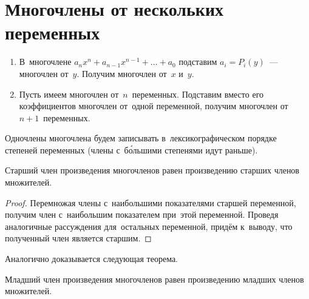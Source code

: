 \section{Многочлены от нескольких переменных}
\begin{enumerate}
	\item В~многочлене $a_n x^n + a_{n-1} x^{n-1} + \ldots + a_0$ подставим $a_i = P_i(y)$~--- многочлен от~$y$.
	Получим многочлен от~$x$ и~$y$.
	
	\item Пусть имеем многочлен от~$n$~переменных.
	Подставим вместо его коэффициентов многочлен от~одной переменной, получим многочлен от~$n + 1$~переменных.
\end{enumerate}

Одночлены многочлена будем записывать в~лексикографическом порядке степеней переменных (члены с~б\'{о}льшими степенями идут раньше).

\begin{theorem}
Старший член произведения многочленов равен произведению старших членов множителей.
\end{theorem}
\begin{proof}
Перемножая члены с~наибольшими показателями старшей переменной, получим член с~наибольшим показателем при~этой переменной.
Проведя аналогичные рассуждения для~остальных переменной, придём к~выводу, что полученный член является старшим.
\end{proof}

Аналогично доказывается следующая теорема.
\begin{theorem}
Младший член произведения многочленов равен произведению младших членов множителей.
\end{theorem}